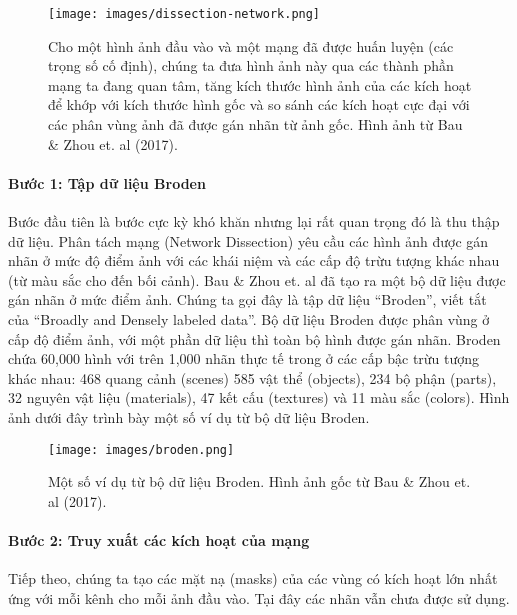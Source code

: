 \begin{figure*}[h!]
	\centering
	\texttt{[image: images/dissection-network.png]}
	\label{fig:7_5}
	\caption{Cho một hình ảnh đầu vào và một mạng đã được huấn luyện (các trọng số cố định), chúng ta đưa hình ảnh này qua các thành phần mạng ta đang quan tâm, tăng kích thước hình ảnh của các kích hoạt để khớp với kích thước hình gốc và so sánh các kích hoạt cực đại với các  phân vùng ảnh đã được gán nhãn từ ảnh gốc. Hình ảnh từ Bau \& Zhou et. al (2017).}
\end{figure*}

\clearpage
\paragraph{Bước 1: Tập dữ liệu Broden}

Bước đầu tiên là bước cực kỳ khó khăn nhưng lại rất quan trọng đó là thu thập dữ liệu. Phân tách mạng (Network Dissection) yêu cầu các hình ảnh được gán nhãn ở mức độ điểm ảnh với các khái niệm và các cấp độ trừu tượng khác nhau (từ màu sắc cho đến bối cảnh). Bau \& Zhou et. al đã tạo ra một bộ dữ liệu được gán nhãn ở mức điểm ảnh. Chúng ta gọi đây là tập dữ liệu ``Broden'', viết tắt của ``Broadly and Densely labeled data''. Bộ dữ liệu Broden được phân vùng ở cấp độ điểm ảnh, với một phần dữ liệu thì toàn bộ hình được gán nhãn. Broden chứa 60,000 hình với trên 1,000 nhãn thực tế trong ở các cấp bậc trừu tượng khác nhau: 468 quang cảnh (scenes) 585 vật thể (objects), 234 bộ phận (parts), 32 nguyên vật liệu (materials), 47 kết cấu (textures) và 11 màu sắc (colors). Hình ảnh dưới đây trình bày một số ví dụ từ bộ dữ liệu Broden.

\begin{figure*}[h!]
	\centering
	\texttt{[image: images/broden.png]}
	\label{fig:7_6}
	\caption{Một số ví dụ từ bộ dữ liệu Broden. Hình ảnh gốc từ Bau \& Zhou et. al (2017).}
\end{figure*}

\clearpage
\paragraph{Bước 2: Truy xuất các kích hoạt của mạng}

Tiếp theo, chúng ta tạo các mặt nạ (masks) của các vùng có kích hoạt lớn nhất ứng với mỗi kênh cho mỗi ảnh đầu vào. Tại đây các nhãn vẫn chưa được sử dụng.

